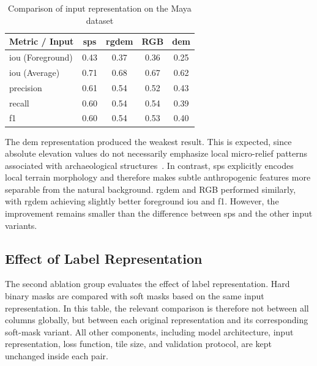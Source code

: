 \begin{table}[H]
    \centering
    \caption{Comparison of input representation on the Maya dataset}
    \label{tab:maya_input_metrics}
    \small
    \setlength{\tabcolsep}{6pt}
    \renewcommand{\arraystretch}{1.15}
    \begin{tabular}{lcccc}
        \toprule
        \textbf{Metric / Input} & \textbf{\gls{sps}} & \textbf{\gls{rgdem}} & \textbf{RGB} & \textbf{\gls{dem}} \\
        \midrule
        \gls{iou} (Foreground) & 0.43 & 0.37 & 0.36 & 0.25 \\
        \gls{iou} (Average)    & 0.71 & 0.68 & 0.67 & 0.62 \\
        precision        & 0.61 & 0.54 & 0.52 & 0.43 \\
        recall           & 0.60 & 0.54 & 0.54 & 0.39 \\
        \gls{f1}         & 0.60 & 0.54 & 0.53 & 0.40 \\
        \bottomrule
    \end{tabular}
\end{table}

The \gls{dem} representation produced the weakest result. This is expected, since absolute elevation values do not necessarily emphasize local micro-relief patterns associated with archaeological structures~\cite{kokalj_standardizing_2025}. In contrast, \gls{sps} explicitly encodes local terrain morphology and therefore makes subtle anthropogenic features more separable from the natural background. \gls{rgdem} and RGB performed similarly, with \gls{rgdem} achieving slightly better foreground \gls{iou} and \gls{f1}. However, the improvement remains smaller than the difference between \gls{sps} and the other input variants.

\subsection{Effect of Label Representation}

The second ablation group evaluates the effect of label representation. Hard binary masks are compared with soft masks based on the same input representation. In this table, the relevant comparison is therefore not between all columns globally, but between each original representation and its corresponding soft-mask variant. All other components, including model architecture, input representation, loss function, tile size, and validation protocol, are kept unchanged inside each pair.

